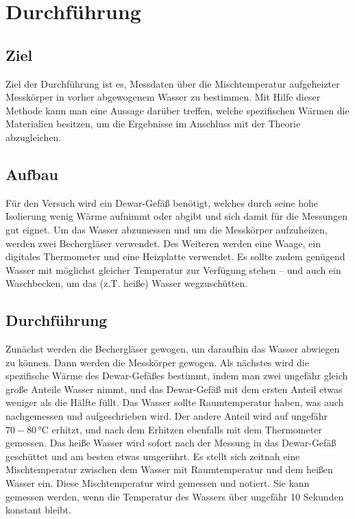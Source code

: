 \section{Durchführung}
\label{sec:Durchführung}
\subsection{Ziel}
Ziel der Durchführung ist es, Messdaten über die Mischtemperatur aufgeheizter Messkörper in vorher abgewogenem Wasser zu bestimmen.
Mit Hilfe dieser Methode kann man eine Aussage darüber treffen, welche spezifischen Wärmen die Materialien besitzen, um die Ergebnisse im Anschluss mit der Theorie abzugleichen. %

\subsection{Aufbau}
Für den Versuch wird ein Dewar-Gefäß benötigt, welches durch seine hohe Isolierung wenig Wärme aufnimmt oder abgibt und sich damit für die Messungen gut eignet. %
Um das Wasser abzumessen und um die Messkörper aufzuheizen, werden zwei Bechergläser verwendet.
Des Weiteren werden eine Waage, ein digitales Thermometer und eine Heizplatte verwendet.
Es sollte zudem genügend Wasser mit möglichst gleicher Temperatur zur Verfügung stehen -- und auch ein Waschbecken, um das (z.T. heiße) Wasser wegzuschütten. %

\subsection{Durchführung}
Zunächst werden die Bechergläser gewogen, um daraufhin das Wasser abwiegen zu können. Dann werden die Messkörper gewogen.
Als nächstes wird die spezifische Wärme des Dewar-Gefäßes bestimmt, indem man zwei ungefähr gleich große Anteile Wasser nimmt, und das Dewar-Gefäß %
mit dem ersten Anteil etwas weniger als die Hälfte füllt. Das Wasser sollte Raumtemperatur haben, was auch nachgemessen und aufgeschrieben wird.
Der andere Anteil wird auf ungefähr $70-80 \, \si{\celsius}$ erhitzt, und nach dem Erhitzen ebenfalls mit dem Thermometer gemessen. %
Das heiße Wasser wird sofort nach der Messung in das Dewar-Gefäß geschüttet und am besten etwas umgerührt.
Es stellt sich zeitnah eine Mischtemperatur zwischen dem Wasser mit Raumtemperatur und dem heißen Wasser ein.
Diese Mischtemperatur wird gemessen und notiert. Sie kann gemessen werden, wenn die Temperatur des Wassers über ungefähr 10 Sekunden konstant bleibt.

